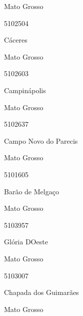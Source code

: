 \documentclass[
  letterpaper,
]{report}
\begin{document}
\n    

\n    

\n      

Mato Grosso

\n      

5102504

\n      

Cáceres

\n    

\n    

\n      

Mato Grosso

\n      

5102603

\n      

Campinápolis

\n    

\n    

\n      

Mato Grosso

\n      

5102637

\n      

Campo Novo do Parecis

\n    

\n    

\n      

Mato Grosso

\n      

5101605

\n      

Barão de Melgaço

\n    

\n    

\n      

Mato Grosso

\n      

5103957

\n      

Glória D\textquotesingle Oeste

\n    

\n    

\n      

Mato Grosso

\n      

5103007

\n      

Chapada dos Guimarães

\n    

\n    

\n      

Mato Grosso
\end{document}
